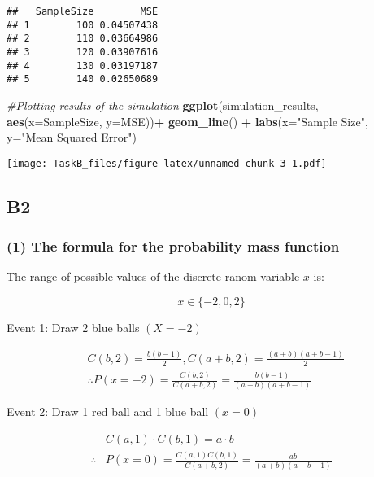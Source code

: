 \documentclass[
]{article}
\newenvironment{Shaded}{\begin{snugshade}}{\end{snugshade}}
\newcommand{\AttributeTok}[1]{\textcolor[rgb]{0.13,0.29,0.53}{#1}}
\newcommand{\CommentTok}[1]{\textcolor[rgb]{0.56,0.35,0.01}{\textit{#1}}}
\newcommand{\FunctionTok}[1]{\textcolor[rgb]{0.13,0.29,0.53}{\textbf{#1}}}
\newcommand{\NormalTok}[1]{#1}
\newcommand{\SpecialCharTok}[1]{\textcolor[rgb]{0.81,0.36,0.00}{\textbf{#1}}}
\newcommand{\StringTok}[1]{\textcolor[rgb]{0.31,0.60,0.02}{#1}}
\begin{document}
\begin{verbatim}
##   SampleSize        MSE
## 1        100 0.04507438
## 2        110 0.03664986
## 3        120 0.03907616
## 4        130 0.03197187
## 5        140 0.02650689
\end{verbatim}

\begin{Shaded}
\begin{Highlighting}[]
\CommentTok{\#Plotting results of the simulation}
\FunctionTok{ggplot}\NormalTok{(simulation\_results,}
       \FunctionTok{aes}\NormalTok{(}\AttributeTok{x=}\NormalTok{SampleSize, }\AttributeTok{y=}\NormalTok{MSE))}\SpecialCharTok{+}
  \FunctionTok{geom\_line}\NormalTok{() }\SpecialCharTok{+}
  \FunctionTok{labs}\NormalTok{(}\AttributeTok{x=}\StringTok{"Sample Size"}\NormalTok{, }\AttributeTok{y=}\StringTok{"Mean Squared Error"}\NormalTok{)}
\end{Highlighting}
\end{Shaded}

\texttt{[image: TaskB\_files/figure-latex/unnamed-chunk-3-1.pdf]}

\subsection{B2}\label{b2}

\subsubsection{(1) The formula for the probability mass
function}\label{the-formula-for-the-probability-mass-function}

The range of possible values of the discrete ranom variable \(x\) is:

\[
x \in\{-2,0,2\}
\]

Event 1: Draw 2 blue balls \((X=-2)\)

\[
\begin{aligned}
& C(b, 2)=\frac{b(b-1)}{2}, C(a+b, 2)=\frac{(a+b)(a+b-1)}{2} \\
& \therefore P(x=-2)=\frac{C(b, 2)}{C(a+b, 2)}=\frac{b(b-1)}{(a+b)(a+b-1)}
\end{aligned}
\]

Event 2: Draw 1 red ball and 1 blue ball \((x=0)\)

\[
\begin{aligned}
& C(a, 1) \cdot C(b, 1)=a \cdot b \\
\therefore  & P(x=0)=\frac{C(a, 1) C(b, 1)}{C(a+b, 2)}=\frac{a b}{(a+b)(a+b-1)}
\end{aligned}
\]
\end{document}
